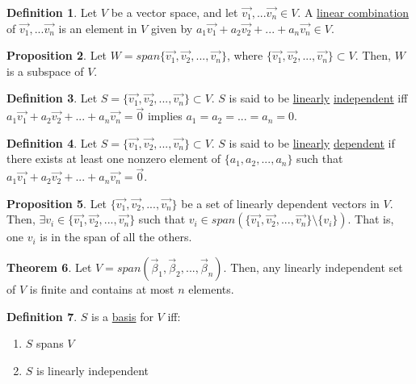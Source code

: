 \documentclass[a5paper]{article}
\theoremstyle{definition}%
\newtheorem{theorem}{Theorem}
\numberwithin{theorem}{section} %
\newtheorem{definition}[theorem]{Definition}
\newtheorem{proposition}[theorem]{Proposition}
\begin{document}
\begin{definition}
Let $V$ be a vector space, and let $\vec{v_1}, ... \vec{v_n} \in V$. A \underline{linear combination} of $\vec{v_1}, ... \vec{v_n}$ is an element in $V$ given by $a_1 \vec{v_1} + a_2 \vec{v_2} + ... + a_n \vec{v_n} \in V$. 
\end{definition}

\begin{proposition}
Let $W = span\{\vec{v_1}, \vec{v_2}, ... , \vec{v_n}\}$, where $\{\vec{v_1}, \vec{v_2}, ... , \vec{v_n}\} \subset V$. Then, $W$ is a subspace of $V$. 
\end{proposition}

\begin{definition}
 Let $S = \{\vec{v_1}, \vec{v_2}, ... , \vec{v_n}\} \subset V$. $S$ is said to be \underline{linearly} \underline{independent} iff $a_1 \vec{v_1} + a_2 \vec{v_2} + ... + a_n \vec{v_n} = \vec{0}$ implies $a_1 = a_2 = ... = a_n = 0$. 
\end{definition}

\begin{definition}
Let $S = \{\vec{v_1}, \vec{v_2}, ... , \vec{v_n}\} \subset V$. $S$ is said to be \underline{linearly} \underline{dependent} if there exists at least one nonzero element of $\{a_1, a_2, ... ,a_n\}$ such that $a_1 \vec{v_1} + a_2 \vec{v_2} + ... + a_n \vec{v_n} = \vec{0}$.
\end{definition}

\begin{proposition}
 Let $\{\vec{v_1}, \vec{v_2}, ... , \vec{v_n}\}$ be a set of linearly dependent vectors in $V$. Then, $\exists v_i \in \{\vec{v_1}, \vec{v_2}, ... , \vec{v_n}\}$ such that $v_i \in span(\{\vec{v_1}, \vec{v_2}, ... , \vec{v_n}\}\setminus\{v_i\})$. That is, one $v_i$ is in the span of all the others.  
\end{proposition}

\begin{theorem}

Let $V = span(\vec{\beta}_1, \vec{\beta}_2, ... , \vec{\beta}_n)$. Then, any linearly independent set of $V$ is finite and contains at most $n$ elements. 
\end{theorem}

\begin{definition} 
$S$ is a \underline{basis} for $V$ iff:
\begin{enumerate}
\item $S$ spans $V$
\item $S$ is linearly independent
\end{enumerate}
\end{definition}
\end{document}
